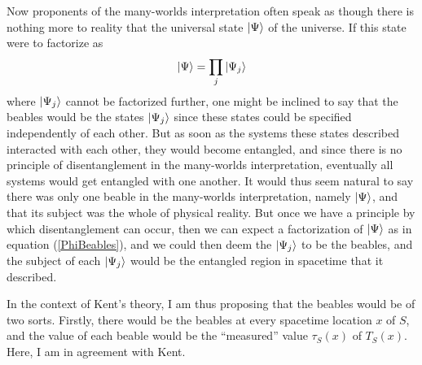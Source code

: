 Now proponents of the many-worlds interpretation often speak as though there is nothing more to reality that the universal state $\ket{\Psi}$ of the universe. If this state were to factorize as 
\begin{equation}\label{PhiBeables}
	\ket{\Psi}=\prod_j\ket{\Psi_j}
\end{equation}
 where $\ket{\Psi_j}$ cannot be factorized further, one might be inclined to say that the beables would be the states $\ket{\Psi_j}$ since these states could be specified independently of each other. But as soon as the systems these states described interacted with each other, they would become entangled, and since there is no principle of disentanglement in the  many-worlds interpretation, eventually all systems would get entangled with one another. It would thus seem natural to say there was only one beable in the many-worlds interpretation, namely $\ket{\Psi}$, and that its subject was the whole of physical reality. But once we have a principle by which disentanglement can occur, then we can expect a factorization of $\ket{\Psi}$ as in equation (\ref{PhiBeables}), and we could then deem the $\ket{\Psi_j}$ to be the beables, and the subject of each $\ket{\Psi_j}$ would be the entangled region in spacetime that it described.  

In the context of Kent's theory, I  am thus proposing that the beables would be of two sorts. Firstly, there would be the beables at every spacetime location $x$ of $S$, and the value of each beable would be the  ``measured'' value $\tau_S(x)$ of $T_S(x)$. Here, I am in agreement with Kent. 

